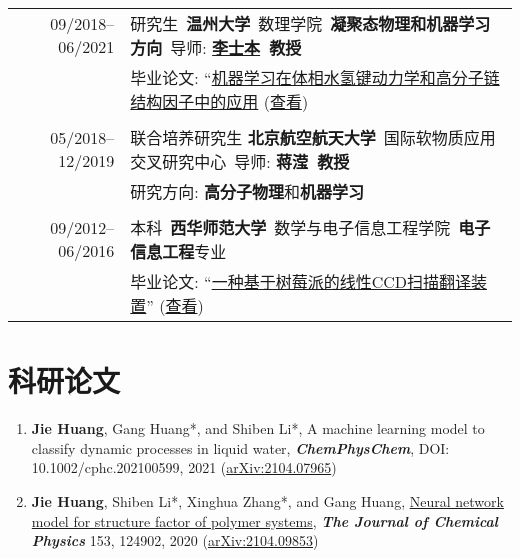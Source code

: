 \documentclass[a4paper,10pt]{article} %
\begin{document}
\begin{tabular}{r|l}	

09/2018--06/2021 				    &研究生\ \textbf{温州大学}\ 数理学院\  \textbf{凝聚态物理和机器学习方向}\ 导师: \textbf{\href{http://slxy.wzu.edu.cn/lsb.pdf}{李士本}\ 教授}\\
                                    & 毕业论文: “\href{https://nbviewer.jupyter.org/github/HuangJiaLian/DataBase0/blob/master/uPic/2021_07_24_12_HuangJieBiYeDaBian.pdf}{机器学习在体相水氢键动力学和高分子链结构因子中的应用} (\href{http://nbviewer.jupyter.org/github/HuangJiaLian/DataBase0/blob/master/uPic/2021_07_24_01_ms_thesis.pdf}{查看})\\

\multicolumn{2}{c}{} \\	%

05/2018--12/2019            & 联合培养研究生 \textbf{北京航空航天大学}\ 国际软物质应用交叉研究中心\ 导师: \textbf{蒋滢\ 教授}  \\	
& 研究方向: \textbf{高分子物理}和\textbf{机器学习}\\

\multicolumn{2}{c}{} \\	%

09/2012--06/2016                    & 本科\ \textbf{西华师范大学}\ 数学与电子信息工程学院\ \textbf{电子信息工程}专业 \\
					 & 毕业论文: “\href{https://nbviewer.jupyter.org/github/HuangJiaLian/DataBase0/blob/master/uPic/2021_07_24_13_CCD_translation_device.pdf}{一种基于树莓派的线性CCD扫描翻译装置}” (\href{https://nbviewer.jupyter.org/github/HuangJiaLian/DataBase0/blob/master/uPic/CCD_Translation_Machine.pdf}{查看})\
\end{tabular}

\section{科研论文}  
\begin{small}
	\begin{enumerate}
		\item \textbf{Jie Huang}, Gang Huang*, and Shiben Li*, A machine learning model to classify dynamic processes in liquid water,   \textbf{\emph{ChemPhysChem}}, DOI: 10.1002/cphc.202100599, 2021 (\href{https://arxiv.org/abs/2104.07965}{arXiv:2104.07965})
		
		\item \textbf{Jie Huang}, Shiben Li*, Xinghua Zhang*, and Gang Huang, \href{https://aip.scitation.org/doi/10.1063/5.0022464}{Neural network model for structure factor of polymer systems},  \textbf{\emph{The Journal of Chemical Physics}} 153, 124902, 2020 (\href{https://arxiv.org/abs/2104.09853}{arXiv:2104.09853})
	\end{enumerate}
\end{small}
\end{document}
